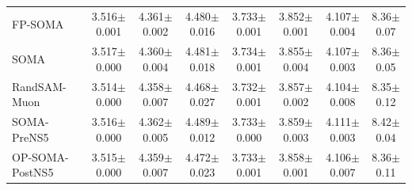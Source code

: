 \begin{table}[t]
{\begin{tabular}{lccccccc}
    FP-SOMA & 3.516{\scriptsize$\pm$0.001} & 4.361{\scriptsize$\pm$0.002} & 4.480{\scriptsize$\pm$0.016} & 3.733{\scriptsize$\pm$0.001} & 3.852{\scriptsize$\pm$0.001} & 4.107{\scriptsize$\pm$0.004} & 8.36{\scriptsize$\pm$0.07} \\
    SOMA & 3.517{\scriptsize$\pm$0.000} & 4.360{\scriptsize$\pm$0.004} & 4.481{\scriptsize$\pm$0.018} & 3.734{\scriptsize$\pm$0.001} & 3.855{\scriptsize$\pm$0.004} & 4.107{\scriptsize$\pm$0.003} & 8.36{\scriptsize$\pm$0.05} \\
    RandSAM-Muon & 3.514{\scriptsize$\pm$0.000} & 4.358{\scriptsize$\pm$0.007} & 4.468{\scriptsize$\pm$0.027} & 3.732{\scriptsize$\pm$0.001} & 3.857{\scriptsize$\pm$0.002} & 4.104{\scriptsize$\pm$0.008} & 8.35{\scriptsize$\pm$0.12} \\
    SOMA-PreNS5 & 3.516{\scriptsize$\pm$0.000} & 4.362{\scriptsize$\pm$0.005} & 4.489{\scriptsize$\pm$0.012} & 3.733{\scriptsize$\pm$0.000} & 3.859{\scriptsize$\pm$0.003} & 4.111{\scriptsize$\pm$0.003} & 8.42{\scriptsize$\pm$0.04} \\
    OP-SOMA-PostNS5 & 3.515{\scriptsize$\pm$0.000} & 4.359{\scriptsize$\pm$0.007} & 4.472{\scriptsize$\pm$0.023} & 3.733{\scriptsize$\pm$0.001} & 3.858{\scriptsize$\pm$0.001} & 4.106{\scriptsize$\pm$0.007} & 8.36{\scriptsize$\pm$0.11} \\
    \bottomrule
  \end{tabular}}
\end{table}
